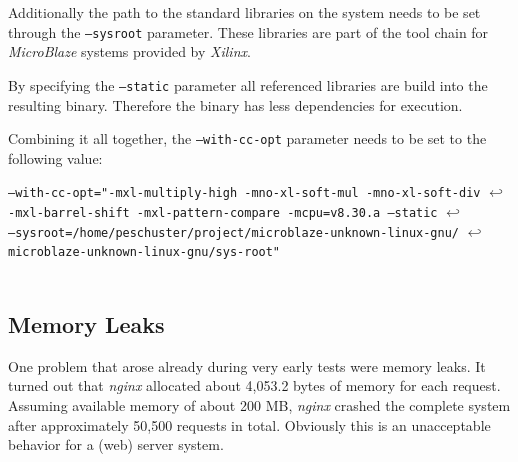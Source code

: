 Additionally the path to the standard libraries on the system needs to be set through the \texttt{--sysroot} parameter. These libraries are part of the tool chain for \textit{MicroBlaze} systems provided by \textit{Xilinx}. 

By specifying the \texttt{--static} parameter all referenced libraries are build into the resulting binary. Therefore the binary has less dependencies for execution.

Combining it all together, the \texttt{--with-cc-opt} parameter needs to be set to the following value: 

\texttt{--with-cc-opt="-mxl-multiply-high -mno-xl-soft-mul -mno-xl-soft-div} $\hookleftarrow$ \\
\texttt{-mxl-barrel-shift -mxl-pattern-compare -mcpu=v8.30.a --static} $\hookleftarrow$ \\
\texttt{--sysroot=/home/peschuster/project/microblaze-unknown-linux-gnu/} $\hookleftarrow$ \\
\texttt{microblaze-unknown-linux-gnu/sys-root"}
\\
\\

\subsection{Memory Leaks}

One problem that arose already during very early tests were memory leaks. It turned out that \textit{nginx} allocated about 4,053.2 bytes of memory for each request. Assuming available memory of about 200 MB, \textit{nginx} crashed the complete system after approximately 50,500 requests in total. Obviously this is an unacceptable behavior for a (web) server system.

